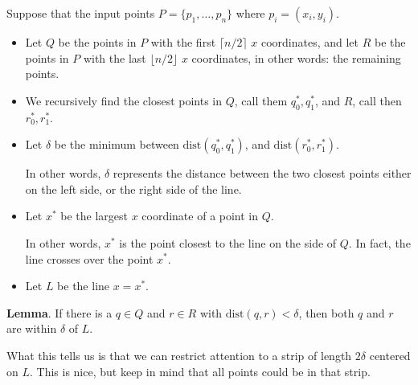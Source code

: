 \documentclass[12pt]{article}
\begin{document}
  Suppose that the input points $P = \{p_1, \dots, p_n\}$ where $p_i = (x_i,
  y_i)$.
  \begin{itemize}
    \item Let $Q$ be the points in $P$ with the first $\lceil n / 2 \rceil$ $x$
      coordinates, and let $R$ be the points in $P$ with the last $\lfloor n / 2
      \rfloor$ $x$ coordinates, in other words: the remaining points.

    \item We recursively find the closest points in $Q$, call them $q_0^*,
      q_1^*$, and $R$, call then $r_0^*, r_1^*$.

    \item Let $\delta$ be the minimum between $\text{dist}(q_0^*, q_1^*)$, and
      $\text{dist}(r_0^*, r_1^*)$.

      In other words, $\delta$ represents the distance between the two closest
      points either on the left side, or the right side of the line.

    \item Let $x^*$ be the largest $x$ coordinate of a point in $Q$.

      In other words, $x^*$ is the point closest to the line on the side of $Q$.
      In fact, the line crosses over the point $x^*$.

    \item Let $L$ be the line $x = x^*$.
  \end{itemize}


  {\bf Lemma}. If there is a $q \in Q$ and $r \in R$ with $\text{dist}(q, r) <
  \delta$, then both $q$ and $r$ are within $\delta$ of $L$.

  What this tells us is that we can restrict attention to a strip of length
  $2\delta$ centered on $L$. This is nice, but keep in mind that all points could
  be in that strip.
\end{document}
